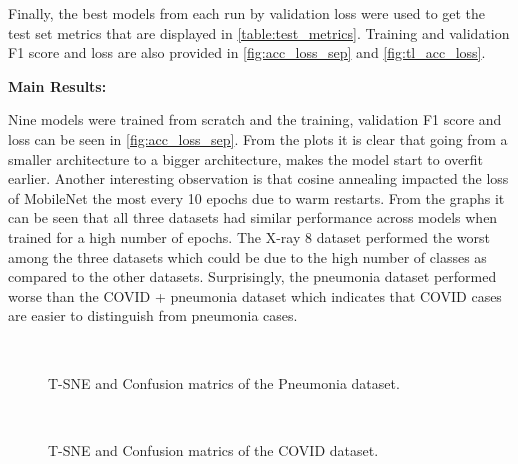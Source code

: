 \documentclass[10pt,twocolumn,letterpaper]{article}
\begin{document}
Finally, the best models from each run by validation loss were used to get the test set metrics that 
are displayed in \cref{table:test_metrics}. Training and validation F1 score and loss are also provided in 
\cref{fig:acc_loss_sep} and \cref{fig:tl_acc_loss}.


\textbf{Main Results:}


Nine models were trained from scratch and the training, validation F1 score and loss can be 
seen in \cref{fig:acc_loss_sep}. From the plots it is clear that going from a smaller 
architecture to a bigger architecture, makes the model start to overfit earlier. Another 
interesting observation is that cosine annealing impacted the loss of MobileNet the most 
every 10 epochs due to warm restarts. From the graphs it can be seen that all three 
datasets had similar performance across models when trained for a high number of epochs. 
The X-ray 8 dataset performed the worst among the three datasets which could be due to the 
high number of classes as compared to the other datasets. Surprisingly, the pneumonia 
dataset performed worse than the COVID + pneumonia dataset which indicates that COVID 
cases are easier to distinguish from pneumonia cases. 



\begin{figure}
  \\
  \caption{T-SNE and Confusion matrics of the Pneumonia dataset.}
  \label{fig:tsne_pneumonia}
\end{figure}

\begin{figure}
  \\
  \caption{T-SNE and Confusion matrics of the COVID dataset.}
  \label{fig:tsne_covid}
\end{figure}
\end{document}
